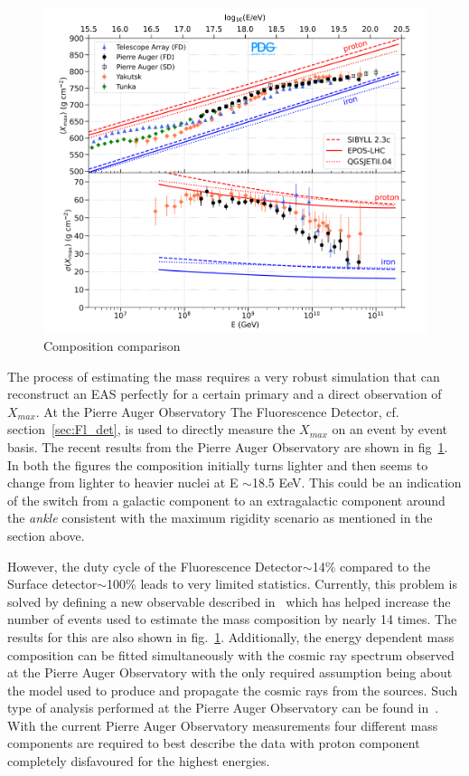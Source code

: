 \begin{figure}[t!]
  \centering
  \includegraphics[width=14.5cm]{thesis_figures/CRnNu/Composition_measurement.png}
  \caption{Composition comparison~\cite{ParticleDataGroup:2024cfk}}
  \label{fig:CR-composition}
\end{figure}

The process of estimating the mass requires a very robust simulation that can reconstruct an EAS perfectly for a certain primary and a direct observation of $X_{max}$. At the Pierre Auger Observatory The Fluorescence Detector, cf. section~\ref{sec:Fl_det}, is used to directly measure the $X_{max}$ on an event by event basis. The recent results from the Pierre Auger Observatory are shown in fig~\ref{fig:CR-composition}. In both the figures the composition initially turns lighter and then seems to change from lighter to heavier nuclei at E $\sim$18.5 EeV. This could be an indication of the switch from a galactic component to an extragalactic component around the \textit{ankle} consistent with the maximum rigidity scenario as mentioned in the section above.

However, the duty cycle of the Fluorescence Detector$\sim$14\% compared to the Surface detector$\sim$100\% leads to very limited statistics. Currently, this problem is solved by defining a new observable described in~\cite{2017arXiv171007249T} which has helped increase the number of events used to estimate the mass composition by nearly 14 times. The results for this are also shown in fig.~\ref{fig:CR-composition}. Additionally, the energy dependent mass composition can be fitted simultaneously with the cosmic ray spectrum observed at the Pierre Auger Observatory with the only required assumption being about the model used to produce and propagate the cosmic rays from the sources. Such type of analysis performed at the Pierre Auger Observatory can be found in~\cite{2018_auger_comp_spec}. With the current Pierre Auger Observatory measurements four different mass components are required to best describe the data with proton component completely disfavoured for the highest energies.

